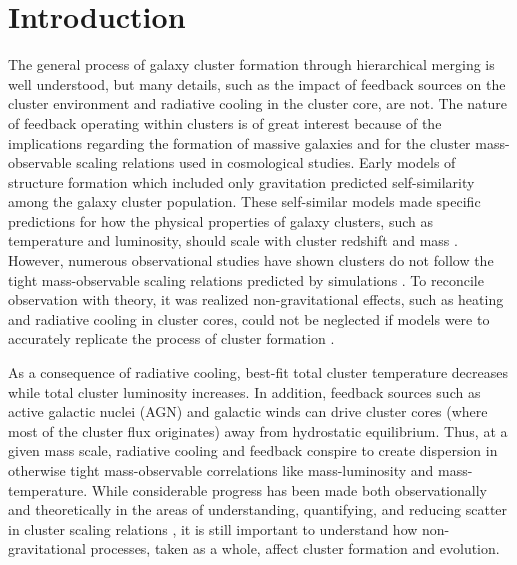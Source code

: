 \documentclass[12pt,preprint]{aastex}
\begin{document}

\section{Introduction}
\label{sec:intro}

The general process of galaxy cluster formation through hierarchical
merging is well understood, but many details, such as the impact of
feedback sources on the cluster environment and radiative cooling in
the cluster core, are not. The nature of feedback operating within
clusters is of great interest because of the implications regarding
the formation of massive galaxies and for the cluster mass-observable
scaling relations used in cosmological studies. Early models of
structure formation which included only gravitation predicted
self-similarity among the galaxy cluster population. These
self-similar models made specific predictions for how the physical
properties of galaxy clusters, such as temperature and luminosity,
should scale with cluster redshift and mass \citep{kaiser86, kaiser91,
1991ApJ...383...95E, nfw1, nfw2, 1996ApJ...469..494E,
1997MNRAS.292..289E, 1997ApJ...480...36T, 1998ApJ...503..569E,
1998ApJ...495...80B}. However, numerous observational studies have
shown clusters do not follow the tight mass-observable scaling
relations predicted by simulations \citep{edge91, 1998MNRAS.297L..57A,
1998ApJ...504...27M, 1999MNRAS.305..631A, 1999ApJ...520...78H,
2000ApJ...536...73N, 2001A&A...368..749F}. To reconcile observation
with theory, it was realized non-gravitational effects, such as
heating and radiative cooling in cluster cores, could not be neglected
if models were to accurately replicate the process of cluster
formation \citep[\eg][]{kaiser91, 1991ApJ...383...95E,
2000ApJ...532...17L, 2002MNRAS.336..409B}.

As a consequence of radiative cooling, best-fit total cluster
temperature decreases while total cluster luminosity increases. In
addition, feedback sources such as active galactic nuclei (AGN) and
galactic winds can drive cluster cores (where most of the cluster flux
originates) away from hydrostatic equilibrium. Thus, at a given mass
scale, radiative cooling and feedback conspire to create dispersion in
otherwise tight mass-observable correlations like mass-luminosity and
mass-temperature. While considerable progress has been made both
observationally and theoretically in the areas of understanding,
quantifying, and reducing scatter in cluster scaling relations
\citep{1996ApJ...458...27B, 2005ApJ...624..606J, kravtsov06, nagai07,
  VV08}, it is still important to understand how non-gravitational
processes, taken as a whole, affect cluster formation and evolution.
\end{document}
